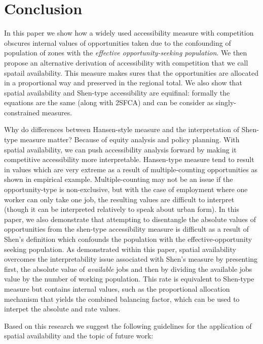 \documentclass[]{elsarticle} %
\begin{document}
\newpage

\hypertarget{conclusion}{%
\section{Conclusion}\label{conclusion}}

In this paper we show how a widely used accessibility measure with
competition obscures internal values of opportunities taken due to the
confounding of population of zones with the \emph{effective
opportunity-seeking population}. We then propose an alternative
derivation of accessibility with competition that we call spatail
availability. This measure makes sures that the opportunities are
allocated in a proportional way and preserved in the regional total. We
also show that spatial availability and Shen-type accessibility are
equifinal: formally the equations are the same (along with 2SFCA) and
can be consider as singly-constrained measures.

Why do differences between Hansen-style measure and the interpretation
of Shen-type measure matter? Because of equity analysis and policy
planning. With spatial availability, we can push accessibility analysis
forward by making it competitive accessibility more interpretable.
Hansen-type measure tend to result in values which are very extreme as a
result of multiple-counting opportunities as shown in empirical example.
Multiple-counting may not be an issue if the opportunity-type is
non-exclusive, but with the case of employment where one worker can only
take one job, the resulting values are difficult to interpret (though it
can be interpreted relatively to speak about urban form). In this paper,
we also demonstrate that attempting to disentangle the absolute values
of opportunities from the shen-type accessibility measure is difficult
as a result of Shen's definition which confounds the population with the
effective-opportunity seeking population. As demonstrated within this
paper, spatial availability overcomes the interpretability issue
associated with Shen's measure by presenting first, the absolute value
of \emph{available} jobs and then by dividing the available jobs value
by the number of working population. This rate is equivalent to
Shen-type measure but contains internal values, such as the proportional
allocation mechanism that yields the combined balancing factor, which
can be used to interpet the absolute and rate values.

Based on this research we suggest the following guidelines for the
application of spatial availability and the topic of future work:
\end{document}
